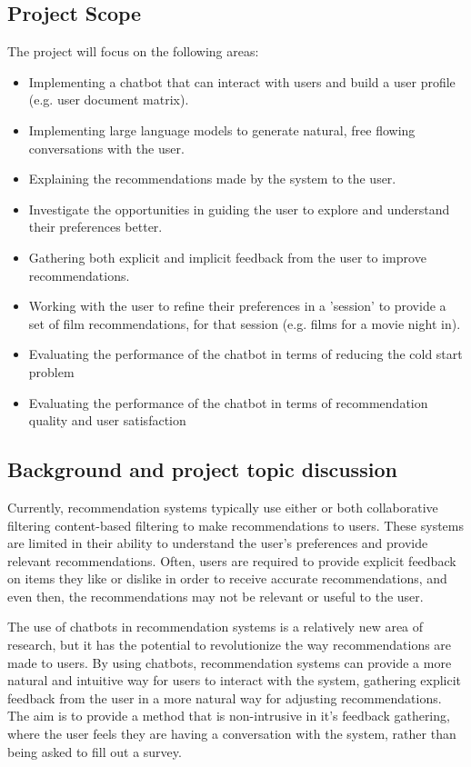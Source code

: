\subsection{Project Scope}
\label{sec:project_scope}
The project will focus on the following areas:
\begin{itemize}
    \item Implementing a chatbot that can interact with users and build a user profile (e.g. user document matrix).
    \item Implementing large language models to generate natural, free flowing conversations with the user.
    \item Explaining the recommendations made by the system to the user.
    \item Investigate the opportunities in guiding the user to explore and understand their preferences better.
    \item Gathering both explicit and implicit feedback from the user to improve recommendations.
    \item Working with the user to refine their preferences in a 'session' to provide a set of film recommendations, for that session (e.g. films for a movie night in).
    \item Evaluating the performance of the chatbot in terms of reducing the cold start problem
    \item Evaluating the performance of the chatbot in terms of recommendation quality and user satisfaction
\end{itemize}

\subsection{Background and project topic discussion}
\label{sec:background}
Currently, recommendation systems typically use either or both collaborative filtering content-based filtering to make recommendations to users.
These systems are limited in their ability to understand the user's preferences and provide relevant recommendations.
Often, users are required to provide explicit feedback on items they like or dislike in order to receive accurate recommendations, and even then, the recommendations may not be relevant or useful to the user.

The use of chatbots in recommendation systems is a relatively new area of research, but it has the potential to revolutionize the way recommendations are made to users. 
By using chatbots, recommendation systems can provide a more natural and intuitive way for users to interact with the system, gathering explicit feedback from the user in a more natural way for adjusting recommendations.
The aim is to provide a method that is non-intrusive in it's feedback gathering, where the user feels they are having a conversation with the system, rather than being asked to fill out a survey.


